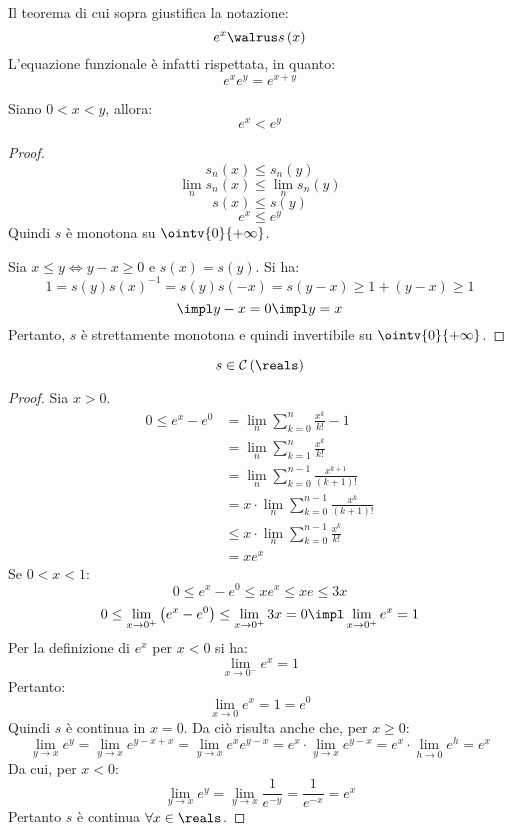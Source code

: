 Il teorema di cui sopra giustifica la notazione:
$$e^x\walrus s\left( x \right)$$
L'equazione funzionale è infatti rispettata, in quanto:
$$e^xe^y=e^{x+y}$$

\begin{theorem}
  Siano $0<x<y$, allora:
  $$e^x< e^y$$
\end{theorem}
\begin{proof}
  $$s_n\left( x \right)\le s_n\left( y \right)$$
  $$\lim_ns_n\left( x \right)\le \lim_ns_n\left( y \right)$$
  $$s\left( x \right)\le s\left( y \right)$$
  $$e^x\le e^y$$
  Quindi $s$ è monotona su $\ointv{0}{+\infty}$.
  
  Sia $x\le y\iff y-x\ge0$ e $s\left( x \right)=s\left( y \right)$. Si ha:
  $$1=s\left( y \right)s\left( x \right)^{-1}=s\left( y \right)s\left( -x \right)=s\left( y-x \right)\ge1+\left( y-x \right)\ge1$$
  $$\impl y-x=0\impl y=x$$
  Pertanto, $s$ è strettamente monotona e quindi invertibile su $\ointv{0}{+\infty}$.
\end{proof}

\begin{theorem}[Continuità di $e^x$]
  $$s\in\mathcal{C}\left( \reals \right)$$
\end{theorem}
\begin{proof}
  Sia $x>0$.
  \begin{align*}
    0\le e^x-e^0 & =\lim_n\sum_{k=0}^n\frac{x^k}{k!}-1                          \\
                 & =\lim_n\sum_{k=1}^n\frac{x^k}{k!}                            \\
                 & =\lim_n\sum_{k=0}^{n-1}\frac{x^{k+1}}{\left( k+1 \right)!}   \\
                 & =x\cdot\lim_n\sum_{k=0}^{n-1}\frac{x^k}{\left( k+1 \right)!} \\
                 & \le x\cdot \lim_n\sum_{k=0}^{n-1}\frac{x^k}{k!}              \\
                 & =xe^x                                                        
  \end{align*}
  Se $0<x<1$:
  $$0\le e^x-e^0\le xe^x\le xe\le 3x$$
  $$0\le \lim_{x\to0^+}\left( e^x-e^0 \right)\le \lim_{x\to0^+}3x=0\impl \lim_{x\to0^+}e^x=1$$
  Per la definizione di $e^x$ per $x<0$ si ha:
  $$\lim_{x\to0^-}e^x=1$$
  Pertanto:
  $$\lim_{x\to0}e^x=1=e^0$$
  Quindi $s$ è continua in $x=0$.
  Da ciò risulta anche che, per $x\ge0$:
  $$\lim_{y\to x}e^y=\lim_{y\to x}e^{y-x+x}=\lim_{y\to x}e^xe^{y-x}=e^x\cdot\lim_{y\to x}e^{y-x}=e^x\cdot\lim_{h\to0}e^h=e^x$$
  Da cui, per $x<0$:
  $$\lim_{y\to x}e^y=\lim_{y\to x}\frac{1}{e^{-y}}=\frac{1}{e^{-x}}=e^x$$
  Pertanto $s$ è continua $\forall x\in\reals$.
\end{proof}

